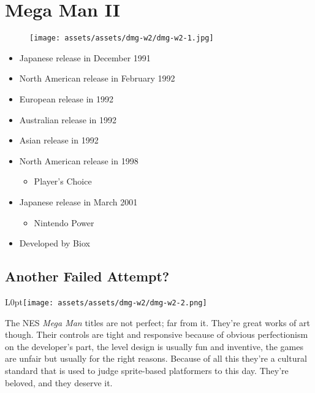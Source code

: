 \documentclass{book}
\begin{document}
\chapter*{Mega Man II}
\vspace{\baselineskip}\begin{figure}[H]{\texttt{[image: assets/assets/dmg-w2/dmg-w2-1.jpg]}}\end{figure}\vspace{\baselineskip}
\begin{itemize}[left=0pt, nosep]
\item Japanese release in December 1991
\item North American release in February 1992
\item European release in 1992
\item Australian release in 1992
\item Asian release in 1992
\item North American release in 1998
\begin{itemize}
\item Player’s Choice
\end{itemize}
\item Japanese release in March 2001
\begin{itemize}
\item Nintendo Power
\end{itemize}
\item Developed by Biox

\end{itemize}
\newpage\FloatBarrier\section*{Another Failed Attempt?}
\begin{wrapfigure}{L}{0pt}{\texttt{[image: assets/assets/dmg-w2/dmg-w2-2.png]}}\end{wrapfigure}\noindent
The NES \emph{Mega Man} titles are not perfect; far from it. They’re great works of art though. Their controls are tight and responsive because of obvious perfectionism on the developer’s part, the level design is usually fun and inventive, the games are unfair but usually for the right reasons. Because of all this they’re a cultural standard that is used to judge sprite-based platformers to this day. They’re beloved, and they deserve it.\par
\end{document}

